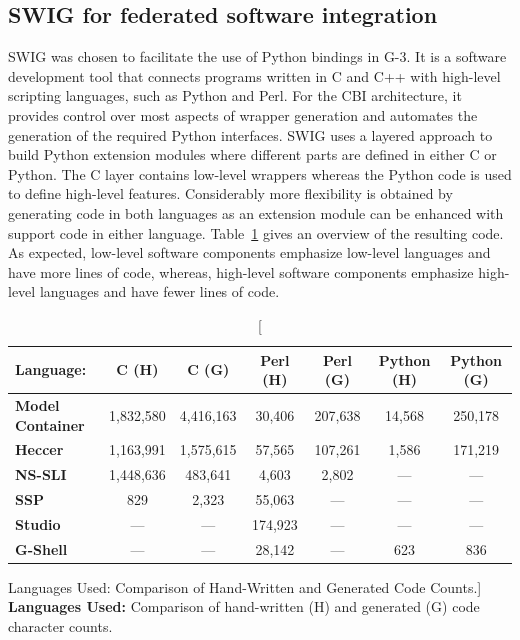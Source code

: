 \documentclass[12pt]{article}
\begin{document}
\subsection{SWIG for federated software integration}

SWIG was chosen to facilitate the use of Python bindings in G-3. It is
a software development tool that connects programs written in C and
C++ with high-level scripting languages, such as Python and Perl. For
the CBI architecture, it provides control over most aspects of wrapper
generation and automates the generation of the required Python
interfaces. SWIG uses a layered approach to build Python extension
modules where different parts are defined in either C or
Python. The C layer contains low-level wrappers whereas the Python
code is used to define high-level features.  Considerably more
flexibility is obtained by generating code in both languages as an
extension module can be enhanced with support code in either language.
Table~\ref{tab:cbi-codecounts} gives an overview of the resulting
code.  As expected, low-level software components emphasize
low-level languages and have more lines of code, whereas, high-level
software components emphasize high-level languages and have fewer lines
of code.

\begin{table}[h]
  \centering
  \begin{tabular}{|l|c|c|c|c|c|c|}
    \hline

    \rule[-2ex]{0mm}{5ex}
    {\bf Language:}
    & {\bf C (H)}
    & {\bf C (G)}
    & {\bf Perl (H)}
    & {\bf Perl (G)}
    & {\bf Python (H)}
    & {\bf Python (G)} \\

    \hline

    \rule[-2ex]{0mm}{5ex}
    {\bf Model\,Container}
    & 1,832,580
    & 4,416,163
    & 30,406
    & 207,638
    & 14,568
    & 250,178 \\

    \rule[-2ex]{0mm}{5ex}
    {\bf Heccer}
    & 1,163,991
    & 1,575,615
    & 57,565
    & 107,261
    & 1,586
    & 171,219 \\

    \rule[-2ex]{0mm}{5ex}
    {\bf NS-SLI}
    & 1,448,636
    & 483,641
    & 4,603
    & 2,802
    & ---
    & --- \\

    \rule[-2ex]{0mm}{5ex}
    {\bf SSP}
    & 829
    & 2,323
    & 55,063
    & ---
    & ---
    & --- \\

    \rule[-2ex]{0mm}{5ex}
    {\bf Studio}
    & ---
    & ---
    & 174,923
    & ---
    & ---
    & --- \\

    \rule[-2ex]{0mm}{5ex}
    {\bf G-Shell}
    & ---
    & ---
    & 28,142
    & ---
    & 623
    & 836 \\

    \hline
  \end{tabular}
  \caption
  [Languages Used: Comparison of Hand-Written and Generated Code Counts.]
  {
    {\bf Languages Used:} Comparison of hand-written (H) and generated (G)  code character counts.
  }
  \label{tab:cbi-codecounts}
\end{table}
\end{document}
